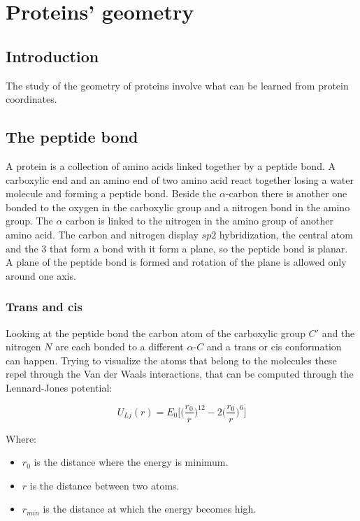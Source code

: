 \chapter{Proteins' geometry}

\section{Introduction}
The study of the geometry of proteins involve what can be learned from protein coordinates.

\section{The peptide bond}
A protein is a collection of amino acids linked together by a peptide bond.
A carboxylic end and an amino end of two amino acid react together losing a water molecule and forming a peptide bond.
Beside the $\alpha$-carbon there is another one bonded to the oxygen in the carboxylic group and a nitrogen bond in the amino group.
The $\alpha$ carbon is linked to the nitrogen in the amino group of another amino acid.
The carbon and nitrogen display $sp2$ hybridization, the central atom and the $3$ that form a bond with it form a plane, so the peptide bond is planar.
A plane of the peptide bond is formed and rotation of the plane is allowed only around one axis.

	\subsection{Trans and cis}
	Looking at the peptide bond the carbon atom of the carboxylic group $C'$ and the nitrogen $N$ are each bonded to a different $\alpha$-$C$ and a trans or cis conformation can happen.
	Trying to visualize the atoms that belong to the molecules these repel through the Van der Waals interactions, that can be computed through the Lennard-Jones potential:

	$$U_{Lj}(r) = E_0\biggl[\biggl(\frac{r_0}{r}\biggr)^{12}-2\biggl(\frac{r_0}{r}\biggr)^6\biggr]$$

	Where:

	\begin{multicols}{2}
		\begin{itemize}
			\item $r_0$ is the distance where the energy is minimum.
			\item $r$ is the distance between two atoms.
			\item $r_{min}$ is the distance at which the energy becomes high.
		\end{itemize}
	\end{multicols}

